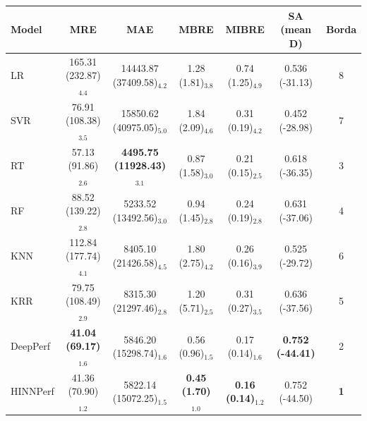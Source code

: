 \begin{tabular}{lcccccc}
\toprule
Model & MRE & MAE & MBRE & MIBRE & SA (mean D) & Borda \\
\midrule
LR & 165.31 (232.87)$_{4.4}$ & 14443.87 (37409.58)$_{4.2}$ & 1.28 (1.81)$_{3.8}$ & 0.74 (1.25)$_{4.9}$ & 0.536 (-31.13) & 8 \\
SVR & 76.91 (108.38)$_{3.5}$ & 15850.62 (40975.05)$_{5.0}$ & 1.84 (2.09)$_{4.6}$ & 0.31 (0.19)$_{4.2}$ & 0.452 (-28.98) & 7 \\
RT & 57.13 (91.86)$_{2.6}$ & \textbf{4495.75 (11928.43)$_{3.1}$} & 0.87 (1.58)$_{3.0}$ & 0.21 (0.15)$_{2.5}$ & 0.618 (-36.35) & 3 \\
RF & 88.52 (139.22)$_{2.8}$ & 5233.52 (13492.56)$_{3.0}$ & 0.94 (1.45)$_{2.8}$ & 0.24 (0.19)$_{2.8}$ & 0.631 (-37.06) & 4 \\
KNN & 112.84 (177.74)$_{4.1}$ & 8405.10 (21426.58)$_{4.5}$ & 1.80 (2.75)$_{4.2}$ & 0.26 (0.16)$_{3.9}$ & 0.525 (-29.72) & 6 \\
KRR & 79.75 (108.49)$_{2.9}$ & 8315.30 (21297.46)$_{2.8}$ & 1.20 (5.71)$_{2.5}$ & 0.31 (0.27)$_{3.5}$ & 0.636 (-37.56) & 5 \\
DeepPerf & \textbf{41.04 (69.17)$_{1.6}$} & 5846.20 (15298.74)$_{1.6}$ & 0.56 (0.96)$_{1.5}$ & 0.17 (0.14)$_{1.6}$ & \textbf{0.752 (-44.41)} & 2 \\
HINNPerf & 41.36 (70.90)$_{1.2}$ & 5822.14 (15072.25)$_{1.5}$ & \textbf{0.45 (1.70)$_{1.0}$} & \textbf{0.16 (0.14)$_{1.2}$} & 0.752 (-44.50) & \textbf{1} \\
\bottomrule
\end{tabular}
